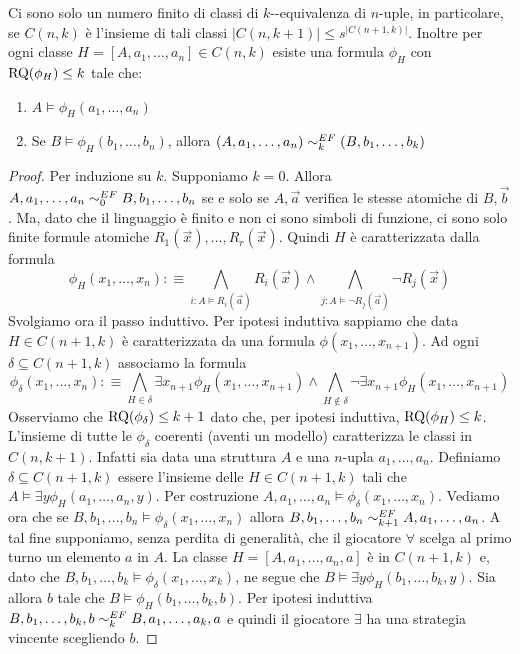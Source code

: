 \begin{lemma}
\label{lemma:finite-formulas}
 Ci sono solo un numero finito di classi di $k$-\EF{}-equivalenza di $n$-uple,
 in particolare, se $C(n,k)$
 è l'insieme di tali classi $|C(n,k+1)| \leq s^{|C(n+1,k)|}$. Inoltre per ogni
 classe $H=[A,a_1,\ldots,a_n] \in C(n,k)$ esiste una formula $\phi_H$
 con $\operatorname{RQ}(\phi_H) \leq k$ tale che:
 \begin{enumerate}
  \item $A \models \phi_H(a_1, \ldots, a_n)$
  \item Se $B \models \phi_H(b_1,\ldots,b_n)$, allora $(A,a_1,\ldots, a_n) \sim^{EF}_k (B,b_1,\ldots,b_k)$
 \end{enumerate}
\end{lemma}
\begin{proof}
 Per induzione su $k$. Supponiamo $k=0$. Allora $A,a_1,\ldots,a_n \sim^{EF}_0 B,b_1,\ldots,b_n$
 se e solo se $A,\vec{a}$ verifica le stesse atomiche di $B,\vec{b}$. Ma,
 dato che il linguaggio è finito e non ci sono simboli di funzione,
 ci sono solo finite formule atomiche $R_1(\vec{x}),\ldots, R_r(\vec{x})$.
 Quindi $H$ è caratterizzata dalla formula
 \[\phi_H(x_1,\ldots,x_n) :\equiv \bigwedge_{i : A \models R_i(\vec{a})} R_i(\vec{x}) \land
   \bigwedge_{j : A \models \neg R_j(\vec{a})} \neg R_j(\vec{x})
 \]
 Svolgiamo ora il passo induttivo. Per ipotesi induttiva sappiamo che data
 $H \in C(n+1,k)$ è caratterizzata da una formula $\phi(x_1,\ldots,x_{n+1})$.
 Ad ogni $\delta \subseteq C(n+1,k)$ associamo la formula
 \[\phi_\delta(x_1,\ldots,x_n) :\equiv
 \bigwedge_{H \in \delta} \exists x_{n+1} \phi_H(x_1,\ldots,x_{n+1}) \land
  \bigwedge_{H \not\in \delta} \neg\exists x_{n+1} \phi_H(x_1,\ldots,x_{n+1})
 \]
 Osserviamo che $\operatorname{RQ}(\phi_\delta) \leq k+1$ dato che, per ipotesi induttiva,
 $\operatorname{RQ}(\phi_H) \leq k$. L'insieme di tutte le $\phi_\delta$ coerenti
 (aventi un modello) caratterizza le classi in $C(n,k+1)$.
 Infatti sia data una struttura $A$ e una $n$-upla $a_1,\ldots,a_n$. Definiamo
 $\delta \subseteq C(n+1,k)$ essere l'insieme delle $H \in C(n+1,k)$
 tali che $A \models \exists y \phi_H(a_1,\ldots,a_n,y)$.
 Per costruzione $A,a_1,\ldots,a_n \models \phi_\delta(x_1,\ldots,x_n)$. Vediamo
 ora che se $B,b_1,\ldots,b_n \models \phi_\delta(x_1,\ldots,x_n)$ allora
 $B,b_1,\ldots,b_n \sim^{EF}_{k+1} A,a_1,\ldots,a_n$. A tal fine supponiamo,
 senza perdita di generalità, che il giocatore $\forall$ scelga al primo turno
 un elemento $a$ in $A$. La classe $H=[A,a_1,\ldots,a_n,a]$ è in $C(n+1, k)$
 e, dato che $B,b_1,\ldots,b_k \models \phi_\delta(x_1,\ldots,x_k)$, ne segue che
 $B \models \exists y \phi_H(b_1,\ldots,b_k,y)$. Sia allora $b$ tale che
 $B \models \phi_H(b_1,\ldots,b_k,b)$. Per ipotesi induttiva
 $B,b_1,\ldots,b_k,b \sim^{EF}_k B,a_1,\ldots,a_k,a$ e quindi il giocatore
 $\exists$ ha una strategia vincente scegliendo $b$.

\end{proof}

